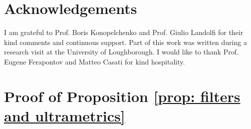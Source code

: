 \documentclass[11pt,british,reqno]{article}
\numberwithin{equation}{section}
\numberwithin{figure}{section}
\numberwithin{table}{section}
\theoremstyle{definition}
\theoremstyle{definition}
\theoremstyle{plain}
\theoremstyle{plain}
\theoremstyle{remark}
\theoremstyle{plain}
\numberwithin{equation}{section}
\numberwithin{figure}{section}
\numberwithin{table}{section}
\theoremstyle{plain}
\begin{document}
\section*{Acknowledgements}

I am grateful to Prof. Boris Konopelchenko and Prof. Giulio Landolfi
for their kind comments and continuous support. Part
of this work was written during a research visit at the University
of Loughborough. I would like to thank Prof. Eugene Ferapontov and
Matteo Casati for kind hospitality. 


\appendix

\section{\label{sec: Appendix A} Proof of Proposition \ref{prop: filters and ultrametrics}}
\end{document}

